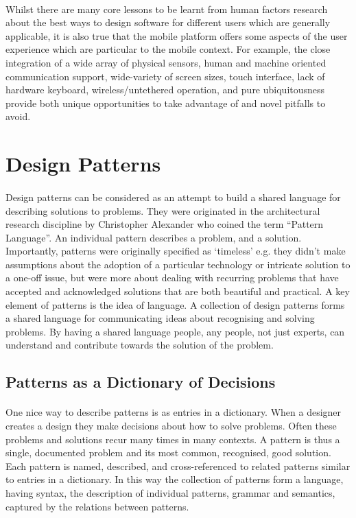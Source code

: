 \documentclass[12pt, a4paper, twoside]{book}
\begin{document}
\paragraph{} Whilst there are many core lessons to be learnt from human factors research about the best ways to design software for different users which are generally applicable, it is also true that the mobile platform offers some aspects of the user experience which are particular to the mobile context. For example, the close integration of a wide array of physical sensors, human and machine oriented communication support, wide-variety of screen sizes, touch interface, lack of hardware keyboard, wireless/untethered operation, and pure ubiquitousness provide both unique opportunities to take advantage of and novel pitfalls to avoid.


\section{Design Patterns}
\paragraph{} Design patterns can be considered as an attempt to build a shared language for describing solutions to problems. They were originated in the architectural research discipline by Christopher Alexander who coined the term ``Pattern Language''. An individual pattern describes a problem, and a solution. Importantly, patterns were originally specified as `timeless' e.g. they didn't make assumptions about the adoption of a particular technology or intricate solution to a one-off issue, but were more about dealing with recurring problems that have accepted and acknowledged solutions that are both beautiful and practical. A key element of patterns is the idea of language. A collection of design patterns forms a shared language for communicating ideas about recognising and solving problems. By having a shared language people, any people, not just experts, can understand and contribute towards the solution of the problem.

\subsection{Patterns as a Dictionary of Decisions}
\paragraph{} One nice way to describe patterns is as entries in a dictionary. When a designer creates a design they make decisions about how to solve problems. Often these problems and solutions recur many times in many contexts. A pattern is thus a single, documented problem and its most common, recognised, good solution. Each pattern is named, described, and cross-referenced to related patterns similar to entries in a dictionary. In this way the collection of patterns form a language, having syntax, the description of individual patterns, grammar and semantics, captured by the relations between patterns.
\end{document}
